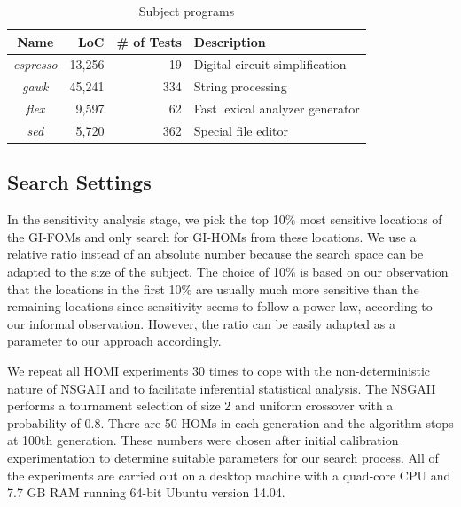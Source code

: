 \documentclass[oribibl]{llncs}
\begin{document}
\begin{table}[!ht]
\centering
\caption{Subject programs}
\label{tab_subject}
\begin{tabular}{crrl}
\hline
Name & LoC & \# of Tests & Description \\
\hline
\emph{espresso} & 13,256 & 19 & Digital circuit simplification\\
\emph{gawk} & 45,241 & 334 & String processing\\
\emph{flex} & 9,597 & 62 & Fast lexical analyzer generator\\
\emph{sed} & 5,720 & 362 & Special file editor\\
\hline
\end{tabular}%
\end{table}




%


\vspace{-3mm}
\subsection{Search Settings}
\label{sec_searchsetting}


In the sensitivity analysis stage, we pick the top 10\% most sensitive locations of the GI-FOMs and only search for GI-HOMs from these locations. We use a relative ratio instead of an absolute number because the search space can be adapted to the size of the subject. The choice of 10\% is based on our observation that the locations in the first 10\% are usually much more sensitive than the remaining locations since sensitivity seems to follow a power law, according to our informal observation. However, the ratio can be easily adapted as a parameter to our approach accordingly.


We repeat all HOMI experiments 30 times to cope with the non-deterministic nature of NSGAII and to facilitate inferential statistical analysis. The NSGAII performs a tournament selection of size 2 and uniform crossover with a probability of 0.8. There are 50 HOMs in each generation and the algorithm stops at 100th generation. These numbers were chosen after initial calibration experimentation to determine suitable parameters for our search process. All of the experiments are carried out on a desktop machine with a quad-core CPU and 7.7 GB RAM running 64-bit Ubuntu version 14.04.
\end{document}
